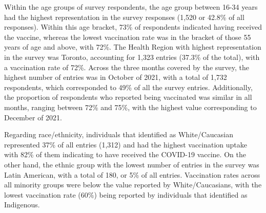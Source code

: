 \documentclass[
  letterpaper,
  DIV=11,
  numbers=noendperiod]{scrartcl}
\begin{document}
Within the age groups of survey respondents, the age group between 16-34
years had the highest representation in the survey responses (1,520 or
42.8\% of all responses). Within this age bracket, 73\% of respondents
indicated having received the vaccine, whereas the lowest vaccination
rate was in the bracket of those 55 years of age and above, with 72\%.
The Health Region with highest representation in the survey was Toronto,
accounting for 1,323 entries (37.3\% of the total), with a vaccination
rate of 72\%. Across the three months covered by the survey, the highest
number of entries was in October of 2021, with a total of 1,732
respondents, which corresponded to 49\% of all the survey entries.
Additionally, the proportion of respondents who reported being
vaccinated was similar in all months, ranging between 72\% and 75\%,
with the highest value corresponding to December of 2021.

Regarding race/ethnicity, individuals that identified as White/Caucasian
represented 37\% of all entries (1,312) and had the highest vaccination
uptake with 82\% of them indicating to have received the COVID-19
vaccine. On the other hand, the ethnic group with the lowest number of
entries in the survey was Latin American, with a total of 180, or 5\% of
all entries. Vaccination rates across all minority groups were below the
value reported by White/Caucasians, with the lowest vaccination rate
(60\%) being reported by individuals that identified as Indigenous.
\end{document}

